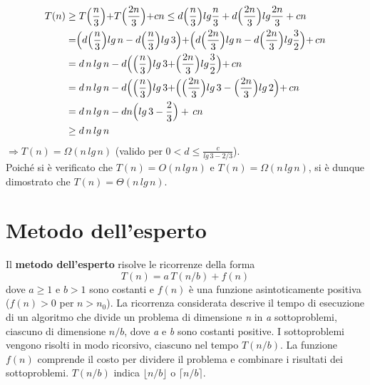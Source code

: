 \documentclass[10pt, a4paper]{report}
\begin{document}
\begin{align*}
T(n) &\geq T\Bigr(\frac{n}{3}\Bigl) + T\Bigr(\frac{2n}{3}\Bigl) + cn \leq d\Bigr(\frac{n}{3}\Bigl)lg\frac{n}{3} + d\Bigr(\frac{2n}{3}\Bigl)lg\frac{2n}{3} + cn \\
&= \Bigr(d\Bigr(\frac{n}{3}\Bigl)lg\,n - d\Bigr(\frac{n}{3}\Bigl)lg\,3\Bigl) + \Bigr(d\Bigr(\frac{2n}{3}\Bigl)lg\,n - d\Bigr(\frac{2n}{3}\Bigl)lg\frac{3}{2}\Bigl) + \,cn \\
&= d\,n\,lg\,n - d\Bigr(\Bigr(\frac{n}{3}\Bigl)lg\,3 + \Bigr(\frac{2n}{3}\Bigl)lg\frac{3}{2}\Bigl) + \,cn \\
&= d\,n\,lg\,n - d\Bigr(\Bigr(\frac{n}{3}\Bigl)lg\,3 + \Bigr(\Bigr(\frac{2n}{3}\Bigl)lg\,3 - \Bigl(\frac{2n}{3}\Bigl)lg\,2 \Bigl) + \,cn \\
&= d\,n\,lg\,n - dn\Bigr(lg\,3 - \frac{2}{3}\Bigr) + \,cn \\
&\geq d\,n\,lg\,n
\end{align*}
$\Rightarrow T(n) = \Omega(n\,lg\,n)$ (valido per $0 < d \leq \frac{c}{lg\,3 - 2/3}$).\\Poiché si è verificato che $T(n) = O(n\,lg\,n)$ e $T(n) = \Omega(n\,lg\,n)$, si è dunque dimostrato che $T(n) = \Theta(n\,lg\,n)$.
\section{Metodo dell'esperto}
Il \textbf{metodo dell'esperto} risolve le ricorrenze della forma
\begin{equation*}
T(n) = a\,T(n/b) + f(n)
\end{equation*}
dove $a \geq 1$ e $b > 1$ sono costanti e $f(n)$ è una funzione asintoticamente positiva ($f(n) > 0$ per $n > n_0$). La ricorrenza considerata descrive il tempo di esecuzione di un algoritmo che divide un problema di dimensione \textit{n} in \textit{a} sottoproblemi, ciascuno di dimensione $n/b$, dove \textit{a} e \textit{b} sono costanti positive. I sottoproblemi vengono risolti in modo ricorsivo, ciascuno nel tempo $T(n/b)$. La funzione $f(n)$ comprende il costo per dividere il problema e combinare i risultati dei sottoproblemi. $T(n/b)$ indica $\lfloor n/b\rfloor$ o $\lceil n/b\rceil$.
\end{document}
